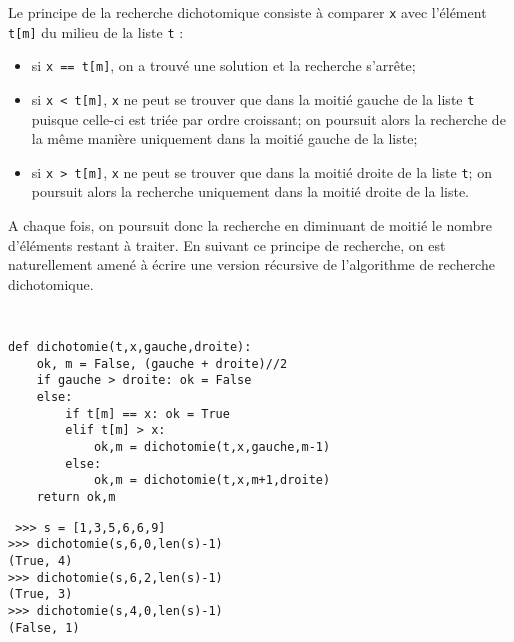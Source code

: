 Le principe de la recherche dichotomique consiste à comparer {\tt x} avec l'élément
{\tt t[m]} du milieu de la liste {\tt t} :
\begin{itemize}
\item si {\tt x == t[m]}, on a trouvé une solution et la recherche s'arrête;
\item si {\tt x < t[m]}, {\tt x} ne peut se trouver que dans la moitié gauche de la liste {\tt t}
	puisque celle-ci est triée par ordre croissant; on poursuit alors la recherche
	de la même manière uniquement dans la moitié gauche de la liste;
\item si {\tt x > t[m]}, {\tt x} ne peut se trouver que dans la moitié droite de la liste {\tt t};
	on poursuit alors la recherche uniquement dans la moitié droite de la liste.
\end{itemize}
A chaque fois, on poursuit donc la recherche en diminuant de moitié le nombre d'éléments 
restant à traiter.
En suivant ce principe de recherche, on est naturellement amené à écrire une version 
récursive de l'algorithme de recherche dichotomique.


\noindent\mbox{}\hspace*{1cm}\begin{py}{8cm}\tt
\begin{verbatim}
def dichotomie(t,x,gauche,droite):
    ok, m = False, (gauche + droite)//2
    if gauche > droite: ok = False
    else: 
        if t[m] == x: ok = True
        elif t[m] > x: 
            ok,m = dichotomie(t,x,gauche,m-1)
        else: 
            ok,m = dichotomie(t,x,m+1,droite)
    return ok,m
\end{verbatim}
\end{py}
\hfill
\begin{py}{7cm}\tt
>>> s = [1,3,5,6,6,9]\\
>>> dichotomie(s,6,0,len(s)-1)\\
(True, 4)\\
>>> dichotomie(s,6,2,len(s)-1)\\
(True, 3)\\
>>> dichotomie(s,4,0,len(s)-1)\\
(False, 1)
\end{py}\\

